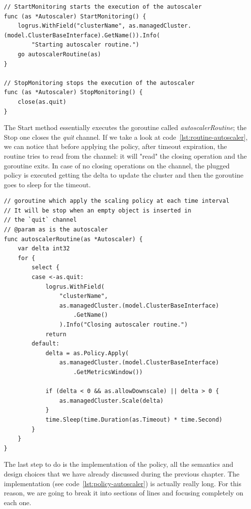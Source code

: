 \documentclass[12pt,twoside,cucitura]{toptesi}
\begin{document}
\begin{lstlisting}[caption={The start and stop methods for the autoscaler},label={lst:ss-autoscaler}]
// StartMonitoring starts the execution of the autoscaler
func (as *Autoscaler) StartMonitoring() {
	logrus.WithField("clusterName", as.managedCluster.(model.ClusterBaseInterface).GetName()).Info(
		"Starting autoscaler routine.")
	go autoscalerRoutine(as)
}

// StopMonitoring stops the execution of the autoscaler
func (as *Autoscaler) StopMonitoring() {
	close(as.quit)
}
\end{lstlisting}

The Start method essentially executes the goroutine called \textit{autoscalerRoutine}; the Stop one closes the \textit{quit} channel. If we take a look at code~\ref{lst:routine-autoscaler}, we can notice that before applying the policy, after timeout expiration, the routine tries to read from the channel: it will "read" the closing operation and the goroutine exits. In case of no closing operations on the channel, the plugged policy is executed getting the delta to update the cluster and then the goroutine goes to sleep for the timeout.

\begin{lstlisting}[caption={The autoscaler goroutine.},label={lst:routine-autoscaler}]
// goroutine which apply the scaling policy at each time interval
// It will be stop when an empty object is inserted in
// the `quit` channel
// @param as is the autoscaler
func autoscalerRoutine(as *Autoscaler) {
	var delta int32
	for {
		select {
		case <-as.quit:
			logrus.WithField(
				"clusterName", 
				as.managedCluster.(model.ClusterBaseInterface)
					.GetName()
				).Info("Closing autoscaler routine.")
			return
		default:
			delta = as.Policy.Apply(
				as.managedCluster.(model.ClusterBaseInterface)
					.GetMetricsWindow())

			if (delta < 0 && as.allowDownscale) || delta > 0 {
				as.managedCluster.Scale(delta)
			}
			time.Sleep(time.Duration(as.Timeout) * time.Second)
		}
	}
}
\end{lstlisting}

The last step to do is the implementation of the policy, all the semantics and design choices that we have already discussed during the previous chapter. The implementation (see code~\ref{lst:policy-autoscaler}) is actually really long. For this reason, we are going to break it into sections of lines and focusing completely on each one.
\end{document}

